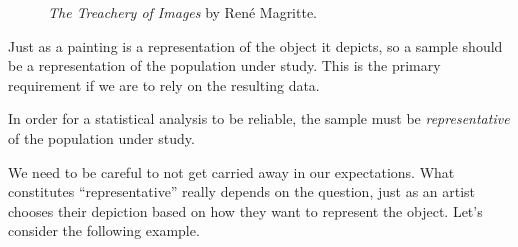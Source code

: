 \documentclass[
  letterpaper,
  DIV=11,
  numbers=noendperiod]{scrreprt}
\theoremstyle{plain}
\theoremstyle{definition}
\theoremstyle{definition}
\theoremstyle{remark}
\begin{document}
\begin{figure}


\caption{\label{fig-data-pipe-img}\emph{The Treachery of Images} by René
Magritte.}

\end{figure}%

Just as a painting is a representation of the object it depicts, so a
sample should be a representation of the population under study. This is
the primary requirement if we are to rely on the resulting data.

\begin{tcolorbox}[enhanced jigsaw, breakable, titlerule=0mm, colframe=quarto-callout-tip-color-frame, bottomtitle=1mm, opacityback=0, rightrule=.15mm, toptitle=1mm, arc=.35mm, bottomrule=.15mm, left=2mm, title=\textcolor{quarto-callout-tip-color}{\faLightbulb}\hspace{0.5em}{Big Idea}, leftrule=.75mm, coltitle=black, toprule=.15mm, colbacktitle=quarto-callout-tip-color!10!white, colback=white, opacitybacktitle=0.6]

In order for a statistical analysis to be reliable, the sample must be
\emph{representative} of the population under study.

\end{tcolorbox}

We need to be careful to not get carried away in our expectations. What
constitutes ``representative'' really depends on the question, just as
an artist chooses their depiction based on how they want to represent
the object. Let's consider the following example.
\end{document}
